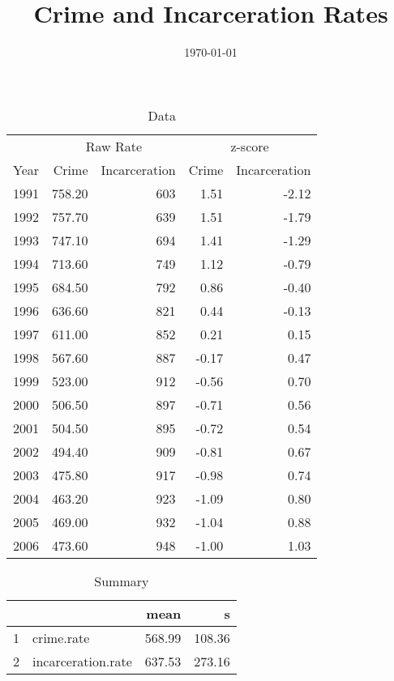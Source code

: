 \documentclass{exam}
\author{}
\title{Crime and Incarceration Rates}
\date{\today}
\begin{document}
  \maketitle

  \begin{table}[H]
    \centering
    \begin{tabular}{rrrrr}
      \toprule
      & \multicolumn{2}{c}{Raw Rate} & \multicolumn{2}{c}{z-score } \\
      \cmidrule(r){2-3} \cmidrule(r){4-5} 
      Year & Crime  & Incarceration & Crime & Incarceration \\
      \midrule
      1991 & 758.20 & 603           & 1.51  & -2.12 \\
      1992 & 757.70 & 639           & 1.51  & -1.79 \\
      1993 & 747.10 & 694           & 1.41  & -1.29 \\
      1994 & 713.60 & 749           & 1.12  & -0.79 \\
      1995 & 684.50 & 792           & 0.86  & -0.40 \\
      1996 & 636.60 & 821           & 0.44  & -0.13 \\
      1997 & 611.00 & 852           & 0.21  & 0.15 \\
      1998 & 567.60 & 887           & -0.17 & 0.47 \\
      1999 & 523.00 & 912           & -0.56 & 0.70 \\
      2000 & 506.50 & 897           & -0.71 & 0.56 \\
      2001 & 504.50 & 895           & -0.72 & 0.54 \\
      2002 & 494.40 & 909           & -0.81 & 0.67 \\
      2003 & 475.80 & 917           & -0.98 & 0.74 \\
      2004 & 463.20 & 923           & -1.09 & 0.80 \\
      2005 & 469.00 & 932           & -1.04 & 0.88 \\
      2006 & 473.60 & 948           & -1.00 & 1.03 \\
      \bottomrule
    \end{tabular}
    \caption{Data}
  \end{table}

  \begin{table}[ht]
    \centering
    \begin{tabular}{rlrr}
      \toprule
        &                    & mean   & s \\
      \midrule
      1 & crime.rate         & 568.99 & 108.36 \\
      2 & incarceration.rate & 637.53 & 273.16 \\
      \bottomrule
    \end{tabular}
    \caption{Summary}
  \end{table}
\end{document}
